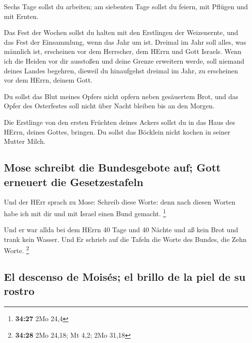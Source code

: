  Sechs Tage sollst du arbeiten; am siebenten Tage sollst
du feiern, mit Pflügen und mit Ernten.

 Das Fest der Wochen sollst du halten mit den Erstlingen
der Weizenernte, und das Fest der Einsammlung, wenn das Jahr um ist.
 Dreimal im Jahr soll alles, was männlich ist, erscheinen
vor dem Herrscher, dem HErrn und Gott Israels.  Wenn ich
die Heiden vor dir ausstoßen und deine Grenze erweitern werde, soll
niemand deines Landes begehren, dieweil du hinaufgehst dreimal im Jahr,
zu erscheinen vor dem HErrn, deinem Gott.

 Du sollst das Blut meines Opfers nicht opfern neben
gesäuertem Brot, und das Opfer des Osterfestes soll nicht über Nacht
bleiben bis an den Morgen.

 Die Erstlinge von den ersten Früchten deines Ackers
sollst du in das Haus des HErrn, deines Gottes, bringen. Du sollst das
Böcklein nicht kochen in seiner Mutter Milch.

\hypertarget{mose-schreibt-die-bundesgebote-auf-gott-erneuert-die-gesetzestafeln}{%
\subsection{Mose schreibt die Bundesgebote auf; Gott erneuert die
Gesetzestafeln}\label{mose-schreibt-die-bundesgebote-auf-gott-erneuert-die-gesetzestafeln}}

 Und der HErr sprach zu Mose: Schreib diese Worte: denn
nach diesen Worten habe ich mit dir und mit Israel einen Bund gemacht.
\footnote{\textbf{34:27} 2Mo 24,4}

 Und er war allda bei dem HErrn 40 Tage und 40 Nächte und
aß kein Brot und trank kein Wasser. Und Er schrieb auf die Tafeln die
Worte des Bundes, die Zehn Worte. \footnote{\textbf{34:28} 2Mo 24,18; Mt
  4,2; 2Mo 31,18}

\hypertarget{el-descenso-de-moisuxe9s-el-brillo-de-la-piel-de-su-rostro}{%
\subsection{El descenso de Moisés; el brillo de la piel de su
rostro}\label{el-descenso-de-moisuxe9s-el-brillo-de-la-piel-de-su-rostro}}

